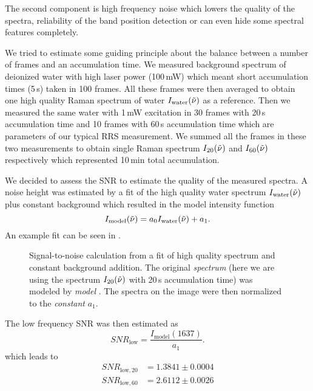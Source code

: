The second component is high frequency noise which lowers the quality of the
spectra, reliability of the band position detection or can even hide some
spectral features completely.

We tried to estimate some guiding principle about the balance between a number
of frames and an accumulation time. We measured background spectrum of
deionized water with high laser power (100\,mW) which meant short accumulation
times (5\,s) taken in 100 frames. All these frames were then averaged to obtain
one high quality Raman spectrum of water $I_\text{water}(\tilde{\nu})$ as a reference.
Then we measured the same water with 1\,mW excitation in 30 frames with 20\,s
accumulation time and 10 frames with 60\,s accumulation time which are
parameters of our typical RRS measurement. We summed all the frames in these
two measurements to obtain single Raman spectrum $I_{20}(\tilde{\nu})$ and
$I_{60}(\tilde{\nu})$ respectively which represented 10\,min total accumulation.

We decided to assess the SNR to estimate the quality of the measured spectra.
A noise height was estimated by a fit of the high quality water spectrum
$I_\text{water}(\tilde{\nu})$ plus constant background which resulted in the model
intensity function
\begin{equation}
	I_\text{model}(\wn) = a_0 I_\text{water}(\wn) + a_1.
	\label{\eqnlabel{accum_length:sn_model}}
\end{equation}
An example fit can be seen in .

\begin{figure}
	\centering
	
	\caption{Signal-to-noise calculation from a fit of high quality spectrum
		and constant background addition. The original \emph{spectrum} (here we are
		using the spectrum $I_{20}(\tilde{\nu})$ with 20\,s accumulation time) was modeled
		by \emph{model} . The spectra on
		the image were then normalized to the \emph{constant} $a_1$.}
	\label{\figlabel{accum_length:sn_ratio}}
\end{figure}

The low frequency SNR was then estimated as
\begin{equation*}
	SNR_\text{low} = \frac{I_\text{model}(1637)}{a_1}.
\end{equation*}
which leads to
\begin{align*}
	SNR_{\text{low},20} &= 1.3841 \pm 0.0004 \\
	SNR_{\text{low},60} &= 2.6112 \pm 0.0026
\end{align*}

